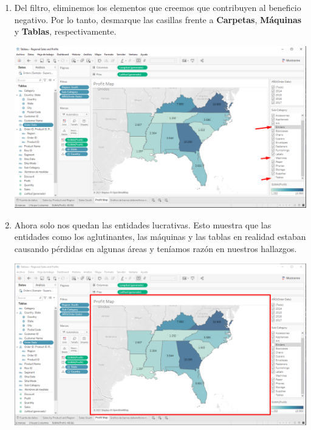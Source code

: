 \documentclass[12pt,letterpaper]{article}
\begin{document}
\begin{enumerate}
\begin{center}
        \end{center}
        \item Del filtro, eliminemos los elementos que creemos que contribuyen al beneficio negativo. Por lo tanto, desmarque las  casillas frente a \textbf{Carpetas}, \textbf{Máquinas} y \textbf{Tablas}, respectivamente.
        \begin{center}
            \includegraphics[width=15cm]{./img/img65.png}
        \end{center}
        \item Ahora solo nos quedan las entidades lucrativas. Esto muestra que las entidades como los aglutinantes, las máquinas y las tablas en realidad estaban causando pérdidas en algunas áreas y teníamos razón en nuestros hallazgos.
        \begin{center}
            \includegraphics[width=15cm]{./img/img66.png}
        \end{center}
    \end{enumerate}
\end{document}
